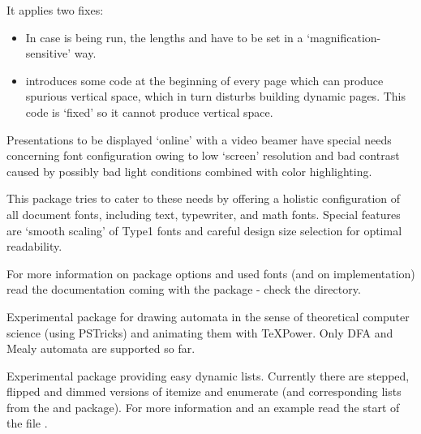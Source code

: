 \begin{slide}
\newslide

It applies two fixes:
\begin{itemize}
\item In case  is being run, the lengths  and  have to
  be set in a `magnification-sensitive' way.

\item {} introduces some code at the beginning of every page which can produce spurious vertical space,
  which in turn disturbs building dynamic pages. This code is `fixed' so it cannot produce vertical space.
\end{itemize}

\newslide

\label{Sec:TPslifonts}
Presentations to be displayed `online' with a video beamer have special needs concerning font configuration owing to low
`screen' resolution and bad contrast caused by possibly bad light conditions combined with color highlighting.

This package tries to cater to these needs by offering a holistic configuration of all document fonts, including text,
typewriter, and math fonts. Special features are `smooth scaling' of Type1 fonts and careful design size selection for
optimal readability.

\newslide

For more information on package options and used fonts (and on implementation) read the documentation coming with the
package - check the  directory.

Experimental package for drawing automata in the sense of theoretical computer
science (using PSTricks) and animating them with TeXPower.  Only DFA and Mealy
automata are supported so far.

\newslide

Experimental package providing easy dynamic lists. Currently there are stepped, flipped and dimmed versions of itemize
and enumerate (and corresponding lists from the  and  package).  For more information
and an example read the start of the file .

\newslide

%

\end{slide}
